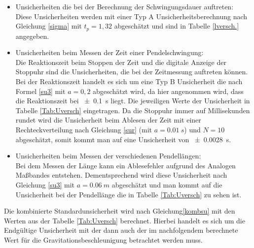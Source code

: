 \begin{itemize}
	\item Unsicherheiten die bei der Berechnung der Schwingungsdauer auftreten:\\
	Diese Unsicherheiten werden mit einer Typ A Unsicherheitsberechnung nach Gleichung \ref{sigma} mit $t_p = 1,32$ abgeschätzt und sind in Tabelle \ref{lversch.} angegeben.
	\item Unsicherheiten beim Messen der Zeit einer Pendelschwingung:\\
	Die Reaktionszeit beim Stoppen der Zeit und die digitale Anzeige der Stoppuhr sind die Unsicherheiten, die bei der Zeitmessung auftreten können. Bei der Reaktionszeit handelt es sich um eine Typ B Unsicherheit die nach Formel \ref{su3} mit $a=0,2$ abgeschätzt wird, da hier angenommen wird, dass die Reaktionszeit bei \SI{+- 0,1}{s} liegt. Die jeweiligen Werte der Unsicherheit in Tabelle \ref{Tab:Uversch} eingetragen. Da die Stoppuhr immer auf Millisekunden rundet wird die Unsicherheit beim Ablesen der Zeit  mit einer Rechteckverteilung nach Gleichung \ref{sur} (mit $a=\SI{0,01}{s}$) und $N=10$ abgeschätzt,  somit kommt man auf eine Unsicherheit von \SI{+-0,0028}{s}.
	
	\item Unsicherheiten beim Messen der verschiedenen Pendellängen:\\
	Bei dem Messen der Länge kann ein Ablesefehler aufgrund des Analogen Maßbandes entstehen. Dementsprechend wird diese Unsicherheit nach Gleichung \ref{su3} mit $a= \SI{0,06}{m}$ abgeschätzt und man kommt auf die Unsicherheit bei der Pendellänge die in Tabelle \ref{Tab:Uversch} zu sehen ist. 
\end{itemize}
 Die kombinierte Standardunsicherheit wird nach Gleichung\ref{kombsu} mit den Werten  aus der Tabelle \ref{Tab:Uversch} berechnet.
 Hierbei handelt es sich um die Endgültige Unsicherheit mit der dann auch der im nachfolgendem berechnete Wert für die Gravitationsbeschleunigung betrachtet werden muss. 
 

